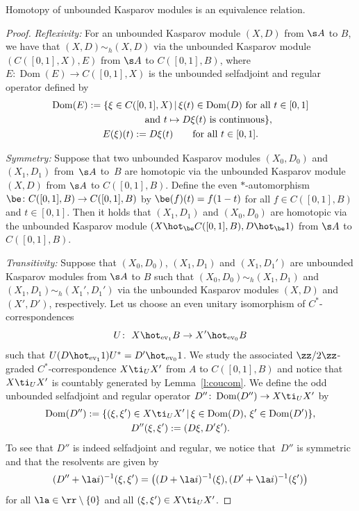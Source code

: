 \begin{prop}\label{p:unbhom}
Homotopy of unbounded Kasparov modules is an equivalence relation.
\end{prop}
\begin{proof}{\it Reflexivity:} For an unbounded Kasparov module $(X,D)$ from $\s A$ to $B$, we have that $(X,D) \sim_h (X,D)$ via the unbounded Kasparov module $( C([0,1],X), E)$ from $\s A$ to $C([0,1],B)$, where $E\colon \operatorname{Dom}(E) \to C( [0,1],X)$ is the unbounded selfadjoint and regular operator defined by
\begin{gather*}
\operatorname{Dom}(E) := \{ \xi \in C( [0,1],X) \,|\, \xi(t) \in \operatorname{Dom}(D) \ \text{for all} \ t \in [0,1] \\
\hphantom{\operatorname{Dom}(E) := \{}{} \text{and} \ t \mapsto D \xi(t) \ \text{is continuous} \}, \\
E(\xi)(t) := D \xi(t) \qquad \text{for all } t \in [0,1] .
\end{gather*}

{\it Symmetry:} Suppose that two unbounded Kasparov modules $(X_0,D_0)$ and $(X_1,D_1)$ from~$\s A$ to~$B$ are homotopic via the unbounded Kasparov module $(X,D)$ from $\s A$ to $C( [0,1],B)$. Define the even $*$-automorphism $\be\colon C( [0,1],B) \to C( [0,1] , B)$ by $\be(f)(t) = f(1 - t)$ for all $f \in C( [0,1],B)$ and $t \in [0,1]$. Then it holds that $(X_1,D_1)$ and $(X_0,D_0)$ are homotopic via the unbounded Kasparov module $(X \hot_{\be} C( [0,1],B), D \hot_{\be} 1)$ from $\s A$ to $C([0,1],B)$.

{\it Transitivity:} Suppose that $(X_0,D_0)$, $(X_1,D_1)$ and $(X_1,D_1')$ are unbounded Kasparov modules from $\s A$ to $B$ such that $(X_0,D_0) \sim_h (X_1,D_1)$ and $(X_1,D_1) \sim_h (X_1',D_1')$ via the unbounded Kasparov modules $(X,D)$ and $(X', D')$, respectively. Let us choose an even unitary isomorphism of $C^*$-correspondences
\[
U\colon \ X \hot_{{\rm ev}_1} B \to X' \hot_{{\rm ev}_0} B
\]
such that $U (D \hot_{{\rm ev}_1} 1) U^* = D' \hot_{{\rm ev}_0} 1$. We study the associated $\zz/2\zz$-graded $C^*$-correspondence $X \ti_U X'$ from $A$ to $C([0,1],B)$ and notice that $X \ti_U X'$ is countably generated by Lemma~\ref{l:coucom}. We define the odd unbounded selfadjoint and regular operator $D''\colon \operatorname{Dom}(D'') \to X \ti_U X'$ by
\begin{gather*}
\operatorname{Dom}(D'') := \{ (\xi,\xi') \in X \ti_U X' \,|\, \xi \in \operatorname{Dom}(D) , \, \xi' \in \operatorname{Dom}(D') \}, \\
D''(\xi,\xi') := (D \xi, D' \xi') .
\end{gather*}
To see that $D''$ is indeed selfadjoint and regular, we notice that~$D''$ is symmetric and that the resolvents are given by
\[
(D'' + \la i )^{-1} (\xi,\xi') = \big( (D + \la i )^{-1}(\xi), (D' + \la i )^{-1}(\xi')\big)
\]
for all $\la \in \rr \setminus \{0\}$ and all $(\xi,\xi') \in X \ti_U X'$.


\end{proof}
